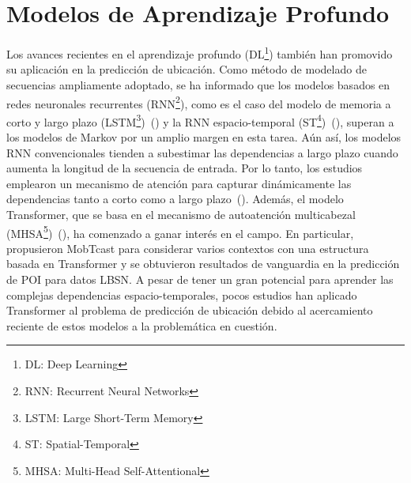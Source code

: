 \section{Modelos de Aprendizaje Profundo}
Los avances recientes en el aprendizaje profundo (DL\footnote{DL: Deep Learning}) también han 
promovido su aplicación en la predicción de ubicación. Como método 
de modelado de secuencias ampliamente adoptado, se ha informado que 
los modelos basados en redes neuronales recurrentes (RNN\footnote{RNN: Recurrent Neural Networks}), como es el caso del
modelo de memoria a corto y largo plazo (LSTM\footnote{LSTM: Large Short-Term Memory})~(\cite{solomon2021analyzing}) y la RNN 
espacio-temporal (ST\footnote{ST: Spatial-Temporal})~(\cite{liu2016predicting}), superan a los modelos de Markov
 por un amplio margen en esta tarea. Aún así, los modelos RNN 
 convencionales tienden a subestimar las dependencias a largo 
 plazo cuando aumenta la longitud de la secuencia de entrada. 
 Por lo tanto, los estudios emplearon un mecanismo de atención 
 para capturar dinámicamente las dependencias tanto a corto 
 como a largo plazo~(\cite{feng2018deepmove,li2020hierarchical}). Además, el modelo Transformer, 
 que se basa en el mecanismo de autoatención multicabezal (MHSA\footnote{MHSA: Multi-Head Self-Attentional})~(\cite{vaswani2017attention}), 
 ha comenzado a ganar interés en el campo. En particular, \cite{xue2021mobtcast}
 propusieron MobTcast para considerar 
  varios contextos con una estructura basada en Transformer 
  y se obtuvieron resultados de vanguardia en la predicción de POI 
  para datos LBSN. A pesar de tener un gran potencial para 
  aprender las complejas dependencias espacio-temporales, pocos 
  estudios han aplicado Transformer al problema de predicción 
  de ubicación debido al acercamiento reciente de estos modelos a la problem\'atica en cuesti\'on.

